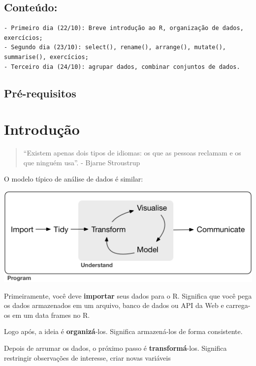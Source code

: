 \documentclass[]{book}
\begin{document}
\hypertarget{conteuxfado}{%
\section{Conteúdo:}\label{conteuxfado}}

\begin{verbatim}
- Primeiro dia (22/10): Breve introdução ao R, organização de dados, exercícios; 
- Segundo dia (23/10): select(), rename(), arrange(), mutate(), summarise(), exercícios;
- Terceiro dia (24/10): agrupar dados, combinar conjuntos de dados.
\end{verbatim}

\hypertarget{pruxe9-requisitos}{%
\section{Pré-requisitos}\label{pruxe9-requisitos}}

\hypertarget{intro}{%
\chapter{Introdução}\label{intro}}

\begin{quote}
``Existem apenas dois tipos de idiomas: os que as pessoas reclamam e os que ninguém usa''. - Bjarne Stroustrup
\end{quote}

O modelo típico de análise de dados é similar:

\begin{center}\includegraphics[width=0.75\linewidth]{imagens/data-science} \end{center}

Primeiramente, você deve \textbf{importar} seus dados para o R. Significa que você pega os dados armazenados em um arquivo, banco de dados ou API da Web e carrega-os em um data frames no R.

Logo após, a ideia é \textbf{organizá}-los. Significa armazená-los de forma consistente.

Depois de arrumar os dados, o próximo passo é \textbf{transformá}-los. Significa restringir observações de interesse, criar novas variáveis
\end{document}
